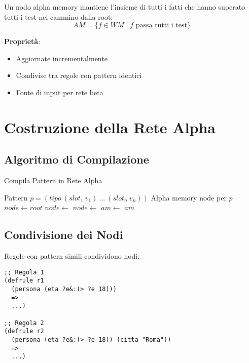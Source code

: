 \begin{definizione}
Un nodo alpha memory mantiene l'insieme di tutti i fatti che hanno superato tutti i test nel cammino dalla root:
\begin{equation}
AM = \{f \in WM \mid f \text{ passa tutti i test}\}
\end{equation}
\end{definizione}

\textbf{Proprietà}:
\begin{itemize}
\item Aggiornate incrementalmente
\item Condivise tra regole con pattern identici
\item Fonte di input per rete beta
\end{itemize}

\section{Costruzione della Rete Alpha}

\subsection{Algoritmo di Compilazione}

\begin{algorithm}
\caption{Compila Pattern in Rete Alpha}
\begin{algorithmic}[1]
\Require Pattern $p = (tipo~(slot_1~v_1)~\ldots~(slot_n~v_n))$
\Ensure Alpha memory node per $p$
  \State $node \gets root$
  \State $node \gets $ 
      \State $node \gets $ 
    \EndIf
  \EndFor
  \State $am \gets $ 
  \State \Return $am$
\EndFunction
\end{algorithmic}
\end{algorithm}

\subsection{Condivisione dei Nodi}

Regole con pattern simili condividono nodi:

\begin{lstlisting}[language=CLIPS]
;; Regola 1
(defrule r1
  (persona (eta ?e&:(> ?e 18)))
  =>
  ...)

;; Regola 2  
(defrule r2
  (persona (eta ?e&:(> ?e 18)) (citta "Roma"))
  =>
  ...)
\end{lstlisting}

